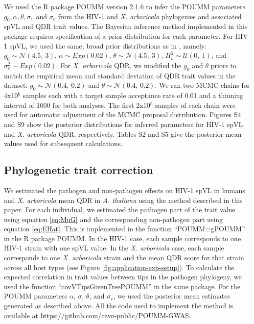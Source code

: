\documentclass[11pt]{article}
\begin{document}
\begin{linenumbers}
We used the R package POUMM version 2.1.6 \citep{Mitov2017a-POUMM} to infer the POUMM parameters $g_0, \alpha, \theta, \sigma, \text{ and }\sigma_e$ from the HIV-1 and \emph{X. arboricola} phylogenies and associated spVL and QDR trait values. The Bayesian inference method implemented in this package requires specification of a prior distribution for each parameter. For HIV-1 spVL, we used the same, broad prior distributions as in \citet{Mitov2018}, namely: $g_{0} \sim \mathcal{N}(4.5,\ 3)$, $\alpha \sim Exp(0.02)$, $\theta \sim \mathcal{N}(4.5,\ 3)$, $H^2_{\bar{t}} \sim \mathcal{U}(0,\ 1)$, and $\sigma^2_e \sim Exp(0.02)$. For \emph{X. arboricola} QDR, we modified the $g_0$ and $\theta$ priors to match the empirical mean and standard deviation of QDR trait values in the dataset: $g_{0} \sim \mathcal{N}(0.4,\ 0.2)$ and $\theta \sim \mathcal{N}(0.4,\ 0.2)$. We ran two MCMC chains for 4x10$^6$ samples each with a target sample acceptance rate of 0.01 and a thinning interval of 1000 for both analyses. The first 2x10$^5$ samples of each chain were used for automatic adjustment of the MCMC proposal distribution. Figures S4 and S9 show the posterior distributions for inferred parameters for HIV-1 spVL and \emph{X. arboricola} QDR, respectively. Tables S2 and S5 give the posterior mean values used for subsequent calculations.

\subsection*{Phylogenetic trait correction}
We estimated the pathogen and non-pathogen effects on HIV-1 spVL in humans and \emph{X. arboricola} mean QDR in \emph{A. thaliana} using the method described in this paper. For each  individual, we estimated the pathogen part of the trait value using equation \ref{eq:MuG} and the corresponding non-pathogen part using equation \ref{eq:EHat}. This is implemented in the function ``POUMM:::gPOUMM'' in the R package POUMM. In the HIV-1 case, each sample corresponds to one HIV-1 strain with one spVL value. In the \emph{X. arboricola} case, each sample corresponds to one \emph{X. arboricola} strain and the mean QDR score for that strain across all host types (see Figure \ref{fig:application-exp-setup}). To calculate the expected correlation in trait values between tips in the pathogen phylogeny, we used the function ``covVTipsGivenTreePOUMM'' in the same package. For the POUMM parameters $\alpha$, $\sigma$, $\theta$, and $\sigma_e$, we used the posterior mean estimates generated as described above. All the code used to implement the method is available at https://github.com/cevo-public/POUMM-GWAS.


\end{linenumbers}
\end{document}
